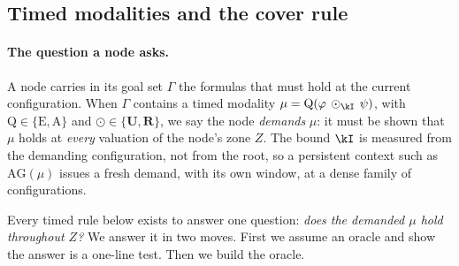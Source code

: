 
\subsection{Timed modalities and the cover rule}\label{sec:timed}

\paragraph{The question a node asks.}
A node carries in its goal set $\Gamma$ the formulas that must hold at the current
configuration. When $\Gamma$ contains a timed modality
$\mu=\mathrm{Q}(\varphi\,\odot_\kI\,\psi)$, with $\mathrm{Q}\in\{\mathrm{E},\mathrm{A}\}$ and
$\odot\in\{\mathbf{U},\mathbf{R}\}$, we say the node \emph{demands} $\mu$: it must be shown that
$\mu$ holds at \emph{every} valuation of the node's zone $Z$. The bound $\kI$ is measured from the
demanding configuration, not from the root, so a persistent context such as $\mathrm{AG}(\mu)$ issues
a fresh demand, with its own window, at a dense family of configurations.

Every timed rule below exists to answer one question: \emph{does the demanded $\mu$ hold throughout
$Z$?} We answer it in two moves. First we assume an oracle and show the answer is a one-line test.
Then we build the oracle.

